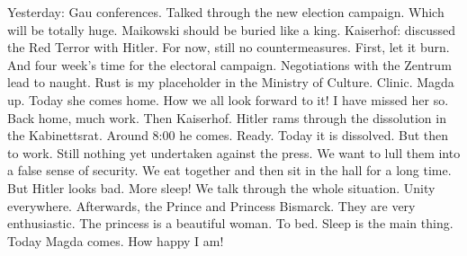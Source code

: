 Yesterday: Gau conferences. Talked through the new election campaign. Which will be totally huge. Maikowski should be buried like a king. Kaiserhof: discussed the Red Terror with Hitler. For now, still no countermeasures. First, let it burn. And four week's time for the electoral campaign. Negotiations with the Zentrum lead to naught. Rust is my placeholder in the Ministry of Culture. Clinic. Magda up. Today she comes home. How we all look forward to it! I have missed her so. Back home, much work. Then Kaiserhof. Hitler rams through the dissolution in the Kabinettsrat. Around 8:00 he comes. Ready. Today it is dissolved. But then to work. Still nothing yet undertaken against the press. We want to lull them into a false sense of security. We eat together and then sit in the hall for a long time. But Hitler looks bad. More sleep! We talk through the whole situation. Unity everywhere. Afterwards, the Prince and Princess Bismarck. They are very enthusiastic. The princess is a beautiful woman. To bed. Sleep is the main thing. Today Magda comes. How happy I am!